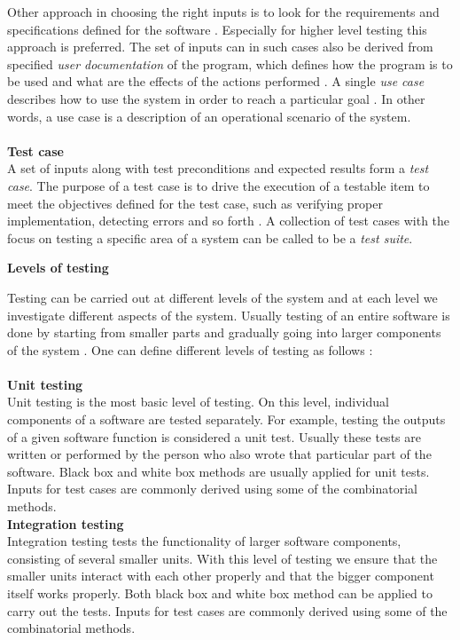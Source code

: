 \documentclass[english,12pt,a4paper,pdftex,elec,utf8]{aaltothesis}
\begin{document}
Other approach in choosing the right inputs is to look for the requirements and specifications defined for the software \cite{artofsofttesting}. Especially for higher level testing this approach is preferred. The set of inputs can in such cases also be derived from specified \textit{user  documentation} of the program, which defines how the program is to be used and what are the effects of the actions performed \cite{artofsofttesting}. A single \textit{use case} describes how to use the system in order to reach a particular goal \cite{sularikurssi}. In other words, a use case is a description of an operational scenario of the system.\\
\\
\textbf{Test case}\\
A set of inputs along with test preconditions and expected results form a \textit{test case}. The purpose of a test case is to drive the execution of a testable item to meet the objectives defined for the test case, such as verifying proper implementation, detecting errors and so forth \cite{ieeesofttesting1}.
A collection of test cases with the focus on testing a specific area of a system can be called to be a \textit{test suite}.   
\begin{center}
\textbf{Levels of testing}
\end{center}
Testing can be carried out at different levels of the system and at each level we investigate different aspects of the system. Usually testing of an entire software is done by starting from smaller parts and gradually going into larger components of the system \cite{sularikurssi, testingcomplex}.
One can define different levels of testing as follows \cite{sularikurssi, artofsofttesting, ieeesofttesting1}:\\ 
\\
\textbf{Unit testing}\\ 
Unit testing is the most basic level of testing. On this level, individual components of a software are tested separately. For example, testing the outputs of a given software function is considered a unit test. Usually these tests are written or performed by the person who also wrote that particular part of the software. Black box and white box methods are usually applied for unit tests. Inputs for test cases are commonly derived using some of the combinatorial methods.\\
\textbf{Integration testing}\\
Integration testing tests the functionality of larger software components, consisting of several smaller units. With this level of testing we ensure that the smaller units interact with each other properly and that the bigger component itself works properly. Both black box and white box method can be applied to carry out the tests. Inputs for test cases are commonly derived using some of the combinatorial methods.\\
\end{document}
